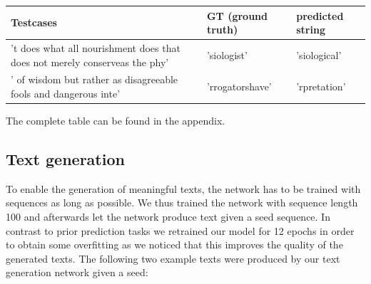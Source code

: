 \documentclass[11pt,a4paper,bibliography=totocnumbered,listof=totocnumbered]{scrartcl}
\begin{document}
\begin{table}[!ht]
\footnotesize
\centering
\begin{tabularx}{\textwidth}{X|X|X}
\textbf{Testcases} & \textbf{GT (ground truth)} & \textbf{predicted string}\\
\toprule 
't does what all nourishment does that does not merely conserveas the phy' & 'siologist' & 'siological' \\
\hline
' of wisdom but rather as disagreeable fools and dangerous inte' & 'rrogatorshave' & 'rpretation' \\ 
\end{tabularx}
	\vskip 1pt
\end{table}

The complete table can be found in the appendix.

\subsection{Text generation} \label{ssec:tg}
To enable the generation of meaningful texts, the network has to be trained with sequences as long as possible. We thus trained the network with sequence length 100 and afterwards let the network produce text given a seed sequence. In contrast to prior prediction tasks we retrained our model for 12 epochs in order to obtain some overfitting as we noticed that this improves the quality of the generated texts. 
The following two example texts were produced by our text generation network given a seed:



\end{document}
